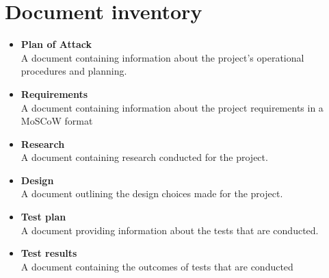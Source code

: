 \documentclass{article} %
\begin{document}
    \newpage

    \section{Document inventory}
    \begin{itemize}
        \item \textbf{Plan of Attack}
        \\
        A document containing information about the project's operational procedures and planning.
        \item \textbf{Requirements}
        \\
        A document containing information about the project requirements in a MoSCoW format
        \item \textbf{Research}
        \\
        A document containing research conducted for the project.
        \item \textbf {Design}
        \\
        A document outlining the design choices made for the project.
        \item \textbf {Test plan}
        \\
        A document providing information about the tests that are conducted.
        \item \textbf {Test results}
        \\
        A document containing the outcomes of tests that are conducted
    \end{itemize}

    \newpage
\end{document}
